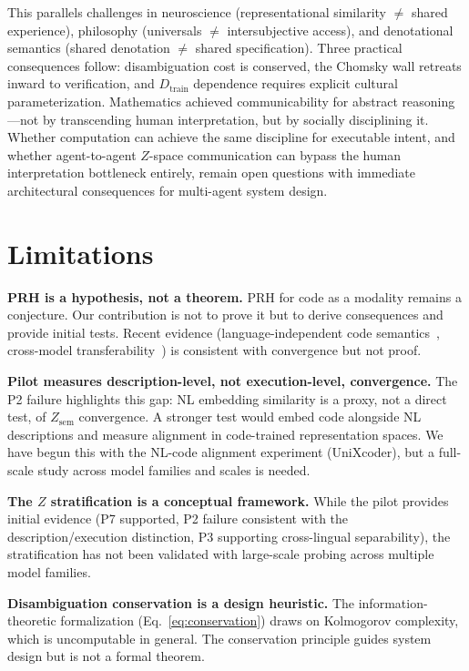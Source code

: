 \documentclass[11pt]{article}
\theoremstyle{definition}
\newcommand{\Zsem}{Z_{\text{sem}}}
\newcommand{\Dtrain}{D_{\text{train}}}
\begin{document}
This parallels challenges in neuroscience (representational similarity $\neq$ shared experience), philosophy (universals $\neq$ intersubjective access), and denotational semantics (shared denotation $\neq$ shared specification). Three practical consequences follow: disambiguation cost is conserved, the Chomsky wall retreats inward to verification, and $\Dtrain$ dependence requires explicit cultural parameterization. Mathematics achieved communicability for abstract reasoning---not by transcending human interpretation, but by socially disciplining it. Whether computation can achieve the same discipline for executable intent, and whether agent-to-agent $Z$-space communication can bypass the human interpretation bottleneck entirely, remain open questions with immediate architectural consequences for multi-agent system design.


\section*{Limitations}

\textbf{PRH is a hypothesis, not a theorem.} PRH for code as a modality remains a conjecture. Our contribution is not to prove it but to derive consequences and provide initial tests. Recent evidence (language-independent code semantics~\cite{beyondsyntax2025}, cross-model transferability~\cite{chen2025crossmodel}) is consistent with convergence but not proof.

\textbf{Pilot measures description-level, not execution-level, convergence.} The P2 failure highlights this gap: NL embedding similarity is a proxy, not a direct test, of $\Zsem$ convergence. A stronger test would embed code alongside NL descriptions and measure alignment in code-trained representation spaces. We have begun this with the NL-code alignment experiment (UniXcoder), but a full-scale study across model families and scales is needed.

\textbf{The $Z$ stratification is a conceptual framework.} While the pilot provides initial evidence (P7 supported, P2 failure consistent with the description/execution distinction, P3 supporting cross-lingual separability), the stratification has not been validated with large-scale probing across multiple model families.

\textbf{Disambiguation conservation is a design heuristic.} The information-theoretic formalization (Eq.~\ref{eq:conservation}) draws on Kolmogorov complexity, which is uncomputable in general. The conservation principle guides system design but is not a formal theorem.
\end{document}

